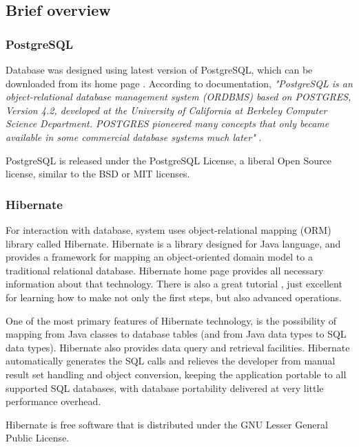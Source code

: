 \subsection{Brief overview}
\label{sub:briefOverview}

\subsubsection{PostgreSQL}
\label{sss:postgreSQL}

Database was designed using latest version of PostgreSQL, which can be downloaded from its home page \cite{PostgresHome}. According to documentation, \textit{"PostgreSQL is an object-relational database management system (ORDBMS) based on  POSTGRES, Version 4.2, developed at the University of California at Berkeley Computer Science Department. POSTGRES pioneered many concepts that only became available in some commercial database systems much later"} \cite{PostgresDocs}.

PostgreSQL is released under the PostgreSQL License, a liberal Open Source license, similar to the BSD or MIT licenses.

\subsubsection{Hibernate}
\label{sss:hibernate}

For interaction with database, system uses object-relational mapping (ORM) library called Hibernate. Hibernate is a library designed for Java language, and provides a framework for mapping an object-oriented domain model to a traditional relational database. Hibernate home page \cite{HibernateHome} provides all necessary information about that technology. There is also a great tutorial \cite{HibernateDocs}, just excellent for learning how to make not only the first steps, but also advanced operations.

One of the most primary features of Hibernate technology, is the possibility of mapping from Java classes to database tables (and from Java data types to SQL data types). Hibernate also provides data query and retrieval facilities. Hibernate automatically generates the SQL calls and relieves the developer from manual result set handling and object conversion, keeping the application portable to all supported SQL databases, with database portability delivered at very little performance overhead.

Hibernate is free software that is distributed under the GNU Lesser General Public License.

